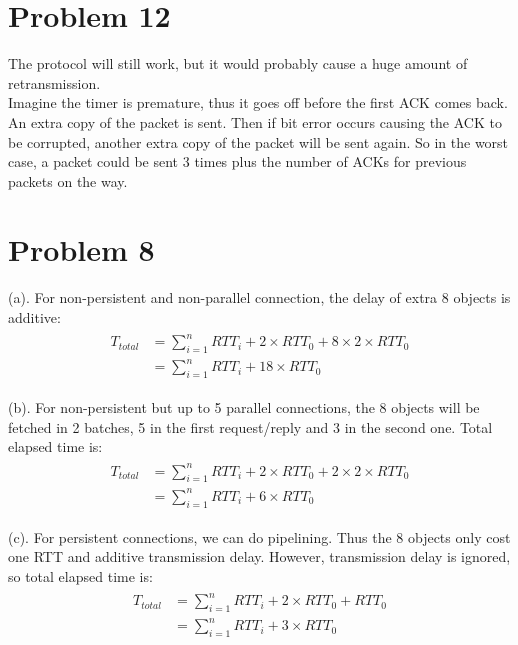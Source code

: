 \documentclass[titlepage, paper=a4, fontsize=11pt]{scrartcl} %
\numberwithin{equation}{section} %
\numberwithin{table}{section} %
\begin{document}
\section*{Problem 12}
The protocol will still work, but it would probably cause a huge amount of retransmission. \\
Imagine the timer is premature, thus it goes off before the first ACK comes back. An extra copy of
the packet is sent. Then if bit error occurs causing the ACK to be corrupted, another extra copy of the packet will be sent again. So in the worst case, a packet could be sent 3 times plus the number of ACKs for previous packets on the way.
\\



\section*{Problem 8}
(a). For non-persistent and non-parallel connection, the delay of extra 8 objects is additive:
\begin{align*} 
\begin{split}
T_{total} &= \sum\limits_{i=1}^n RTT_{i} + 2 \times RTT_{0} + 8 \times 2 \times RTT_{0} \\
&= \sum\limits_{i=1}^n RTT_{i} + 18 \times RTT_{0}
\end{split}					
\end{align*}

(b). For non-persistent but up to 5 parallel connections, the 8 objects will be fetched in 2 batches,
5 in the first request/reply and 3 in the second one. Total elapsed time is:
\begin{align*} 
\begin{split}
T_{total} &= \sum\limits_{i=1}^n RTT_{i} + 2 \times RTT_{0} + 2 \times 2 \times RTT_{0} \\
&= \sum\limits_{i=1}^n RTT_{i} + 6 \times RTT_{0}
\end{split}					
\end{align*}

(c). For persistent connections, we can do pipelining. Thus the 8 objects only cost one RTT and additive
transmission delay. However, transmission delay is ignored, so total elapsed time is:
\begin{align*} 
\begin{split}
T_{total} &= \sum\limits_{i=1}^n RTT_{i} + 2 \times RTT_{0} + RTT_{0} \\
&= \sum\limits_{i=1}^n RTT_{i} + 3 \times RTT_{0}
\end{split}					
\end{align*}
\\
\end{document}
